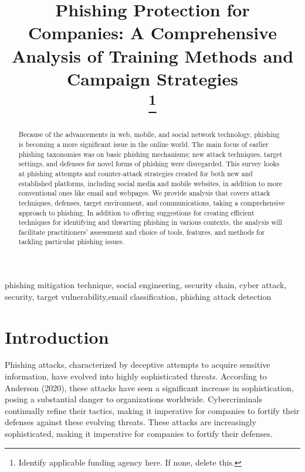 \documentclass[conference]{IEEEtran}
\begin{document}
\title{Phishing Protection for Companies: A Comprehensive Analysis of Training Methods and Campaign Strategies\\
{\footnotesize \textsuperscript{}}
\thanks{Identify applicable funding agency here. If none, delete this.}
}

\author{
\and
{}
\and
{}
\and
}

\maketitle

\begin{abstract}Because of the advancements in web, mobile, and social network technology, phishing is becoming a more significant issue in the online world. The main focus of earlier phishing taxonomies was on basic phishing mechanisms; new attack techniques, target settings, and defenses for novel forms of phishing were disregarded. This survey looks at phishing attempts and counter-attack strategies created for both new and established platforms, including social media and mobile websites, in addition to more conventional ones like email and webpages. We provide analysis that covers attack techniques, defenses, target environment, and communications, taking a comprehensive approach to phishing. In addition to offering suggestions for creating efficient techniques for identifying and thwarting phishing in various contexts, the analysis will facilitate practitioners' assessment and choice of tools, features, and methods for tackling particular phishing issues.
\end{abstract}

\begin{IEEEkeywords}
phishing mitigation technique, social engineering, security chain, cyber attack, security, target vulnerability,email classification, phishing attack detection
\end{IEEEkeywords}

\section{Introduction}
Phishing attacks, characterized by deceptive attempts to acquire sensitive information, have evolved into highly sophisticated threats. According to Anderson (2020), these attacks have seen a significant increase in sophistication, posing a substantial danger to organizations worldwide. Cybercriminals continually refine their tactics, making it imperative for companies to fortify their defenses against these evolving threats. These attacks are increasingly sophisticated, making it imperative for companies to fortify their defenses.
\end{document}
